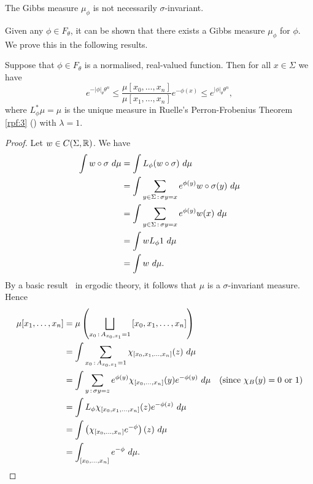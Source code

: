 \begin{remark}
	The Gibbs measure $\mu_\phi$ is not necessarily $\sigma$-invariant.
\end{remark}

Given any $\phi \in F_\theta$, it can be shown that there exists a Gibbs measure $\mu_\phi$ for $\phi$. We prove this in the following results.

\begin{proposition} \label{prop:pp-3-2}
	Suppose that $\phi \in F_\theta$ is a normalised, real-valued function. Then for all $x \in \Sigma$ we have
	\begin{equation}
		e^{-|\phi|_\theta \theta^n} \leq \frac{\mu[x_0, \dots, x_n]}{\mu[x_1, \dots, x_n]} e^{-\phi(x)} \leq e^{|\phi|_\theta \theta^n},
	\end{equation}
	where $L_\phi^*\mu = \mu$ is the unique measure in Ruelle's Perron-Frobenius Theorem \ref{rpf:3} () with $\lambda = 1$.
	\begin{proof}
		Let $w \in C(\Sigma, \mathbb{R})$. We have
		\begin{align*}
			\int{w \circ \sigma\ d\mu} &= \int L_\phi(w \circ \sigma)\ d\mu \\
				&= \int{\sum_{y \in \Sigma \,:\,\sigma{y} = x}{e^{\phi(y)} w \circ \sigma(y)}\ d\mu} \\
				&= \int{\sum_{y \in \Sigma \,:\,\sigma{y} = x}{e^{\phi(y)} w(x)}\ d\mu} \\
				&= \int{w L_\phi{1}\ d\mu} \\
				&= \int{w\ d\mu}.
		\end{align*}
		By a basic result~\cite[Lemma 11.3]{ergodic-lectures} in ergodic theory, it follows that $\mu$ is a $\sigma$-invariant measure. Hence
		\begin{align}
			\mu[x_1, \dots, x_n] &= \mu\left(\bigsqcup_{x_0 \midcolon A_{x_0, x_1} = 1}{[x_0, x_1, \dots, x_n]}\right) \nonumber \\
				&= \int{\sum_{x_0 \midcolon A_{x_0, x_1} = 1} \chi_{[x_0, x_1, \dots, x_n]}(z)\ d\mu} \nonumber \\
				&= \int{\sum_{y \midcolon \sigma{y} = z} e^{\phi(y)} \chi_{[x_0, \dots, x_n]}(y) e^{-\phi(y)}\ d\mu} & (\text{since } \chi_B(y) = 0 \text{ or } 1) \nonumber \\
				&= \int{L_\phi\chi_{[x_0, x_1, \dots, x_n]}(z) e^{-\phi(z)}\ d\mu} \nonumber \\
				&= \int{\left(\chi_{[x_0, \dots, x_n]} e^{-\phi}\right)(z)\ d\mu} \nonumber \\
				&= \int_{[x_0, \dots, x_n]}{e^{-\phi}\ d\mu}. \label{fml:prop-3-2-mu-e}

\end{align}
\end{proof}
\end{proposition}
